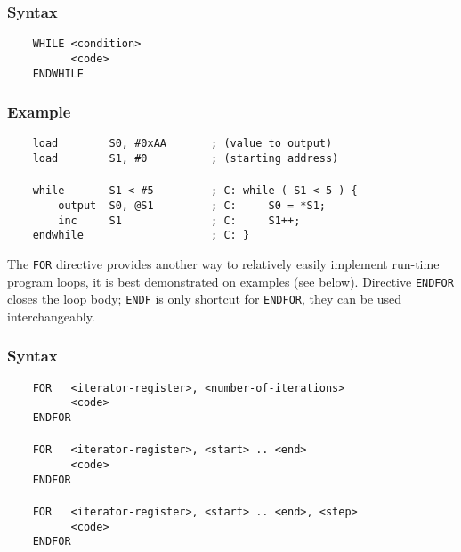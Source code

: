         \subsubsection{Syntax}
            \verb'    WHILE <condition>'\\
            \verb'          <code>'\\
            \verb'    ENDWHILE'

        \subsubsection{Example}
            \verb'    load        S0, #0xAA       ; (value to output)'\\
            \verb'    load        S1, #0          ; (starting address)'\\
            \verb''\\
            \verb'    while       S1 < #5         ; C: while ( S1 < 5 ) {'\\
            \verb'        output  S0, @S1         ; C:     S0 = *S1;'\\
            \verb'        inc     S1              ; C:     S1++;'\\
            \verb'    endwhile                    ; C: }'

    \clearpage
        The \texttt{FOR} directive provides another way to relatively easily implement run-time program loops, it is best demonstrated on examples (see below). Directive \texttt{ENDFOR} closes the loop body; \texttt{ENDF} is only shortcut for \texttt{ENDFOR}, they can be used interchangeably.

        \subsubsection{Syntax}
            \verb'    FOR   <iterator-register>, <number-of-iterations>'\\
            \verb'          <code>'\\
            \verb'    ENDFOR'\\
            \verb''\\
            \verb'    FOR   <iterator-register>, <start> .. <end>'\\
            \verb'          <code>'\\
            \verb'    ENDFOR'\\
            \verb''\\
            \verb'    FOR   <iterator-register>, <start> .. <end>, <step>'\\
            \verb'          <code>'\\
            \verb'    ENDFOR'

